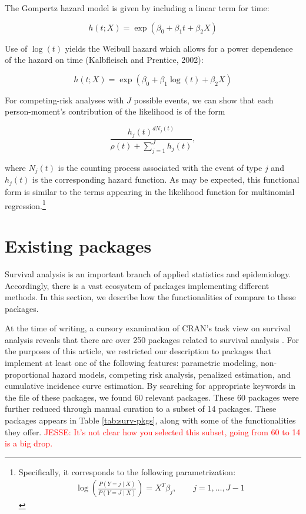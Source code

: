 \documentclass[
]{jss}
\begin{document}
The Gompertz hazard model is given by including a linear term for time:

\[ h(t;X)  = \exp(\beta_0 + \beta_1 t + \beta_2 X) \]

Use of \(\log(t)\) yields the Weibull hazard which allows for a power
dependence of the hazard on time (Kalbfleisch and Prentice, 2002):

\[ h(t;X)  = \exp(\beta_0 + \beta_1 \log(t) + \beta_2 X) \]

For competing-risk analyses with \(J\) possible events, we can show that
each person-moment's contribution of the likelihood is of the form

\[\frac{h_j(t)^{dN_j(t)}}{\rho(t) + \sum_{j=1}^Jh_j(t)},\]

where \(N_j(t)\) is the counting process associated with the event of
type \(j\) and \(h_j(t)\) is the corresponding hazard function. As may
be expected, this functional form is similar to the terms appearing in
the likelihood function for multinomial
regression.\footnote{Specifically, it corresponds to the following parametrization: \begin{align*} \log\left(\frac{P(Y=j \mid X)}{P(Y = J \mid X)}\right) = X^T\beta_j, \qquad j = 1,\ldots, J-1\end{align*}}

\hypertarget{existing-packages}{%
\section{Existing packages}\label{existing-packages}}

Survival analysis is an important branch of applied statistics and
epidemiology. Accordingly, there is a vast ecosystem of 
packages implementing different methods. In this section, we describe
how the functionalities of  compare to these packages.

At the time of writing, a cursory examination of CRAN's task view on
survival analysis reveals that there are over 250 packages related to
survival analysis \citeyearpar{survTaskView}. For the purposes of this
article, we restricted our description to packages that implement at
least one of the following features: parametric modeling,
non-proportional hazard models, competing risk analysis, penalized
estimation, and cumulative incidence curve estimation. By searching for
appropriate keywords in the  file of these packages,
we found 60 relevant packages. These 60 packages were further reduced
through manual curation to a subset of 14 packages. These packages
appears in Table \ref{tab:surv-pkgs}, along with some of the
functionalities they offer.
\textcolor{red}{JESSE: It's not clear how you selected this subset, going from 60 to 14 is a big drop.}
\end{document}
